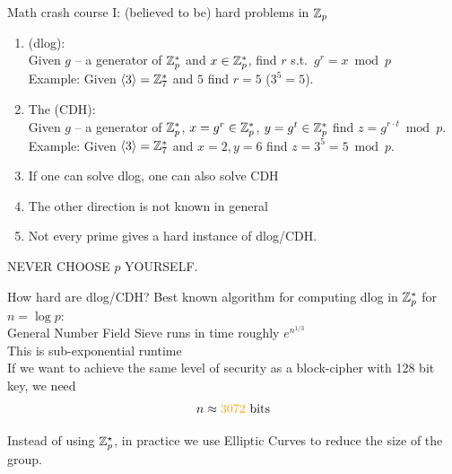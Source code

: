 \documentclass[usenames,dvipsnames, 9pt]{beamer}
\begin{document}
\begin{frame}{Math crash course I: (believed to  be) hard problems in ${{\mathbb Z}}_p$}
	\large
	\begin{enumerate}
		\itemsep 10pt
		\item {\color{Orange}{The discrete logarithm problem} (dlog):} \\
			Given $g$ -- a generator of ${{\mathbb Z}}_p^\ast$ and $x \in {{\mathbb Z}}_p^\ast$, find $r$ s.t.\ $g^r = x \bmod p$ \\
			Example: Given $\langle 3 \rangle =  {{\mathbb Z}}_7^\ast$ and $5$ find $r = 5$ ($3^5 = 5$).
			\pause
		\item The {\color{Orange}{Computational Diffie-Hellman problem} (CDH):} \\
			Given $g$ -- a generator of ${{\mathbb Z}}_p^\ast$,  $x = g^r \in {{\mathbb Z}}_p^\ast$, $y = g^t \in {{\mathbb Z}}_p^\ast$ find $z = g^{r\cdot t} \bmod p$. \\
			Example: Given $\langle 3 \rangle  = {{\mathbb Z}}_7^\ast$ and $x = 2, y = 6 $ find $z = 3^5 = 5 \bmod p$.
		\pause
		\item If one can solve dlog, one can also solve CDH
		\item The other direction is not known in general
		\Large
		\item {\color{Orange}{The hardness of both problems depend on the choice of $p$!} Not every prime gives a hard instance of dlog/CDH. }
	\end{enumerate}
\centering NEVER CHOOSE $p$ YOURSELF.
\end{frame}

\begin{frame}{How hard are dlog/CDH?}
	\Large 
	Best known algorithm for computing dlog in ${{\mathbb Z}}_p^\ast$ for $n=\log p$:\\[5pt]
	\huge General Number Field Sieve \Large runs in time roughly \Huge {\color{Orange}$e^{n^{1/3}}$}\\[5pt]
	\Large
	This is sub-exponential runtime \\
	\pause
	If we want to achieve the same level of security as a block-cipher with {\color{Orange}128} bit key, we need 
	\[
		n \approx {\color{Orange}3072} \text{ bits}
	\]
	
	Instead of using ${{\mathbb Z}}_p^\star$, in practice we use Elliptic Curves to reduce the size of the group. 
\end{frame}
\end{document}
